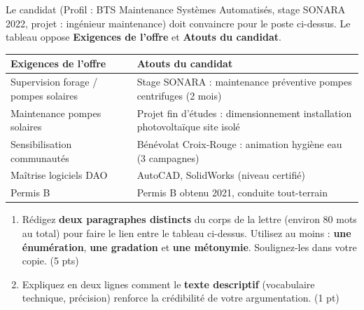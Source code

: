 \documentclass[11pt]{article}
\begin{document}
\begin{exercice}
Le candidat (Profil : BTS Maintenance Systèmes Automatisés, stage SONARA 2022, projet : ingénieur maintenance) doit convaincre pour le poste ci-dessus. Le tableau oppose \textbf{Exigences de l'offre} et \textbf{Atouts du candidat}.

\begin{tabular}{|p{5cm}|p{5cm}|}
\hline
\textbf{Exigences de l'offre} & \textbf{Atouts du candidat} \\ \hline
Supervision forage / pompes solaires & Stage SONARA : maintenance préventive pompes centrifuges (2 mois) \\ \hline
Maintenance pompes solaires & Projet fin d'études : dimensionnement installation photovoltaïque site isolé \\ \hline
Sensibilisation communautés & Bénévolat Croix-Rouge : animation hygiène eau (3 campagnes) \\ \hline
Maîtrise logiciels DAO & AutoCAD, SolidWorks (niveau certifié) \\ \hline
Permis B & Permis B obtenu 2021, conduite tout-terrain \\ \hline
\end{tabular}
\begin{enumerate}
    \item Rédigez \textbf{deux paragraphes distincts} du corps de la lettre (environ 80 mots au total) pour faire le lien entre le tableau ci-dessus. Utilisez au moins : \textbf{une énumération}, \textbf{une gradation} et \textbf{une métonymie}. Soulignez-les dans votre copie. (5 pts)
    \item Expliquez en deux lignes comment le \textbf{texte descriptif} (vocabulaire technique, précision) renforce la crédibilité de votre argumentation. (1 pt)
\end{enumerate}
\end{exercice}
\end{document}
